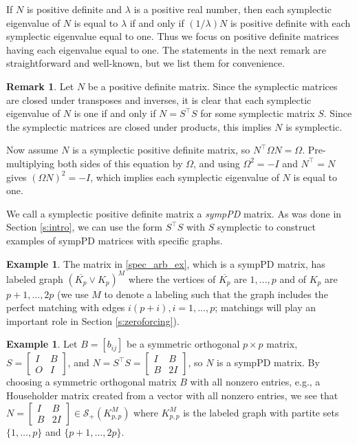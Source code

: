 \documentclass[12pt]{article}
\theoremstyle{definition}
\newtheorem{rem}[thm]{Remark}
\theoremstyle{definition}
\theoremstyle{definition}
\newtheorem{ex}[thm]{Example}
\numberwithin{figure}{section}
\numberwithin{equation}{section}
\newcommand{\symp}{\mathcal{S}_+}
\newcommand{\trans}{^{\top}}
\newcommand{\mtx}[1]{\begin{bmatrix} #1 \end{bmatrix}}
\begin{document}
 If $N$ is positive definite and $\lambda $ is a positive real number, then each symplectic eigenvalue of $N$ is  equal to $\lambda$ if and only if $(1/\lambda )N$ is positive definite with each symplectic 
eigenvalue equal to one. Thus we focus on positive definite matrices having each eigenvalue equal to one. The statements in the next remark are straightforward and well-known, but we list them for convenience.
\begin{rem}\label{r:sympPDequiv}
 Let $N$ be a positive definite matrix.  Since the symplectic matrices are closed under transposes and  inverses, it is clear that each symplectic eigenvalue of $N$ is one if and only if 
 $N=S\trans S$ for some symplectic matrix $S$. Since the symplectic matrices are closed under  products, this implies 
 $N$ is symplectic. 
 
 Now assume $N$ is a symplectic positive definite matrix, so $N\trans \Omega N=\Omega$.
Pre-multiplying both sides of this  equation by $\Omega$,
and using $\Omega^2=-I$ and $N\trans=N$ gives $(\Omega N)^2=-I$, which implies each symplectic eigenvalue of $N$ is equal to one. \end{rem}
 
 We call a symplectic positive definite matrix 
a \emph{sympPD} matrix.
As was done in Section \ref{s:intro}, we can use the form $S\trans S$ with $S$ symplectic  to construct examples of sympPD matrices with specific graphs.

 \begin{ex}\label{pK1veeKp}
 The matrix 
 in \eqref{spec_arb_ex}, which is a sympPD matrix, has  labeled graph  
$(\overline{K_{p}} \vee K_{p})^{M}$
where the vertices of $\overline{K_p}$ are $1,\ldots, p$
and of $K_p$ are $p+1, \ldots, 2p$  (we use $M$ to
denote a labeling such that the graph includes  the perfect matching with  edges $i(p+i), i=1,\dots,p$; matchings 
will play an important role in Section \ref{s:zeroforcing}).     
\end{ex}




\begin{ex}\label{KppSympPD} 
Let $B=[b_{ij}]$ be a symmetric   orthogonal $p\times p$ matrix,  $S=\mtx{I & B\\O & I}$, and  $N=S\trans S=\mtx{ I & B \\      B & 2I }$, so $N$ is a sympPD matrix.
  By choosing a symmetric orthogonal matrix $B$ with all nonzero entries, e.g., a Householder matrix created from a vector with all nonzero entries, 
we see that $N=\mtx{I & B \\
       B &  2I}\in \symp(K_{p,p}^M)$ where  $K_{p,p}^M$ is the labeled graph with partite sets $\{1,\dots,p\}$ and $\{p+1,\dots,2p\}$.
\end{ex}
\end{document}
